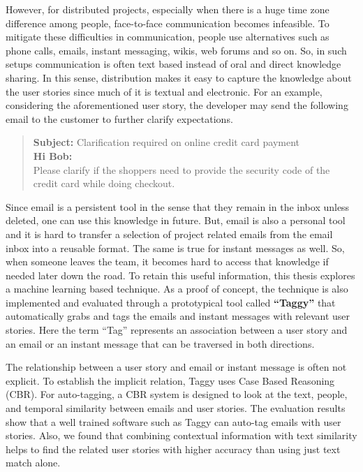 However, for distributed projects, especially when there is a huge time zone difference among people, face-to-face communication becomes infeasible. To mitigate these difficulties in communication, people use alternatives such as phone calls, emails, instant messaging, wikis, web forums and so on. So, in such setups communication is often text based instead of oral and direct knowledge sharing. In this sense, distribution makes it easy to capture the knowledge about the user stories since much of it is textual and electronic. For an example, considering the aforementioned user story, the developer may send the following email to the customer to further clarify expectations.\\

\begin{quote}
\textbf{Subject:} Clarification required on online credit card payment\\
\textbf{Hi Bob:}\\
Please clarify if the shoppers need to provide the security code of the credit card while doing checkout.
\end{quote}

Since email is a persistent tool in the sense that they remain in the inbox unless deleted, one can use this knowledge in future. But, email is also a personal tool and it is hard to transfer a selection of project related emails from the email inbox into a reusable format. The same is true for instant messages as well. So, when someone leaves the team, it becomes hard to access that knowledge if needed later down the road. To retain this useful information, this thesis explores a machine learning based technique. As a proof of concept, the technique is also implemented and evaluated through a prototypical tool called \textbf{``Taggy''} that automatically grabs and tags the emails and instant messages with relevant user stories. Here the term ``Tag'' represents an association between a user story and an email or an instant message that can be traversed in both directions.

The relationship between a user story and email or instant message is often not explicit. To establish the implicit relation, Taggy uses  Case Based Reasoning (CBR). For auto-tagging, a CBR system is designed to look at the text, people, and temporal similarity between emails and user stories. The evaluation results show that a well trained software such as Taggy can auto-tag emails with user stories. Also, we found that combining contextual information with text similarity helps to find the related user stories with higher accuracy than using just text match alone.

